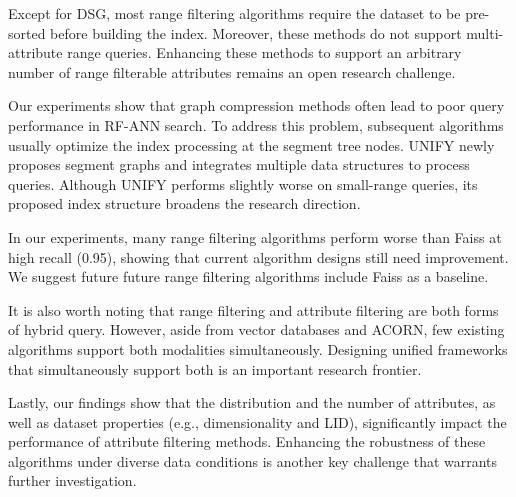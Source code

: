 \documentclass[sigconf, nonacm]{acmart}
\begin{document}
	Except for DSG, most range filtering algorithms require the dataset to be pre-sorted before building the index. Moreover, these methods do not support multi-attribute range queries. Enhancing these methods to support an arbitrary number of range filterable attributes remains an open research challenge.
	
	Our experiments show that graph compression methods often lead to poor query performance in RF-ANN search. To address this problem, subsequent algorithms usually optimize the index processing at the segment tree nodes. UNIFY newly proposes segment graphs and integrates multiple data structures to process queries. Although UNIFY performs slightly worse on small-range queries, its proposed index structure broadens the research direction.
	
		In our experiments, many range filtering algorithms perform worse than Faiss at high recall (0.95), showing that current algorithm designs still need improvement. We suggest future future range filtering algorithms include Faiss as a baseline.
	
	
	It is also worth noting that range filtering and attribute filtering are both forms of hybrid query. However, aside from vector databases and ACORN, few existing algorithms support both modalities simultaneously. Designing unified frameworks that simultaneously support both is an important research frontier. 
	
	Lastly, our findings show that the distribution and the number of attributes, as well as dataset properties (e.g., dimensionality and LID), significantly impact the performance of attribute filtering methods. Enhancing the robustness of these algorithms under diverse data conditions is another key challenge that warrants further investigation.
	
	
\end{document}
